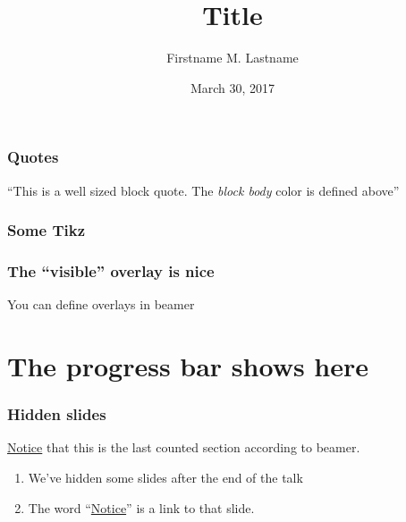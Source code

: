 \documentclass{beamer}
\title[Title in footer]{Title}
\author[Name in footer]{Firstname M. Lastname}
\date[Date in footer]{March 30, 2017}
\institute[Tufts University]{Tufts University\\Department of Mathematics}
\begin{document}
\begin{frame}[plain] %
  \frametitle{}
\titlepage
\end{frame}

\begin{frame}
  \frametitle{Quotes}
 \begin{block}{}
   {\large ``This is a well sized block quote. The
     \emph{block body} color is defined above''

     }  \vskip5mm \hspace*{}
 \end{block}
\end{frame}

\begin{frame}
  \frametitle{Some Tikz}
\end{frame}
\begin{frame}
\frametitle{The ``visible'' overlay is nice}
  You can define \alert{overlays} in beamer 


  
\end{frame}


\section{The progress bar shows here}
\begin{frame}
\label{hiddenslide1-origin}
\frametitle{Hidden slides}
  \hyperlink{hiddenslide1}{Notice} that this is the last counted section according to
  beamer.
  
  \begin{enumerate}
  \item<2-> We've hidden some slides after the end of the
    talk
  \item<3-> The word ``\hyperlink{hiddenslide1}{Notice}'' is
    a link to that slide.
  \end{enumerate}
\end{frame}
\appendix
\end{document}
